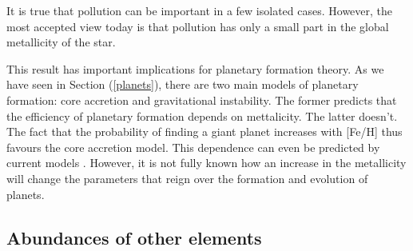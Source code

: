 \documentclass[dvips,12pt,a4paper]{report}
\begin{document}
It is true that pollution can be important in a few isolated cases. However, the most accepted view today is that pollution has only a small part in the global metallicity of the star.

This result has important implications for planetary formation theory. As we have seen in Section (\ref {planets}), there are two main models of planetary formation: core accretion and gravitational instability. The former predicts that the efficiency of planetary formation depends on mettalicity. The latter doesn't. The fact that the probability of finding a giant planet increases with [Fe/H] thus favours the core accretion model. This dependence can even be predicted by current models \citep{Ida-2004a}. However, it is not fully known how an increase in the metallicity will change the parameters that reign over the formation and evolution of planets. 



\subsection {Abundances of other elements} %
\label {others}
\end{document}
